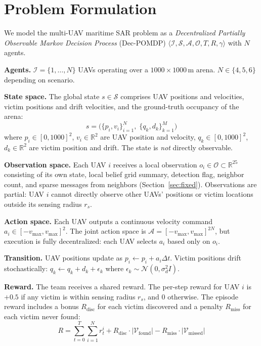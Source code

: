 \documentclass[journal]{IEEEtran}
\begin{document}
\section{Problem Formulation}
\label{sec:problem}

We model the multi-UAV maritime SAR problem as a \emph{Decentralized Partially
Observable Markov Decision Process} (Dec-POMDP) \cite{decentralized_pomdp}
$\langle \mathcal{I}, \mathcal{S}, \mathcal{A}, \mathcal{O}, T, R, \gamma \rangle$
with $N$ agents.

\textbf{Agents.} $\mathcal{I} = \{1, \ldots, N\}$ UAVs operating over a
$1000 \times 1000$\,m arena. $N \in \{4, 5, 6\}$ depending on scenario.

\textbf{State space.} The global state $s \in \mathcal{S}$ comprises UAV positions
and velocities, victim positions and drift velocities, and the ground-truth occupancy
of the arena:
\begin{equation}
  s = \bigl(\{p_i, v_i\}_{i=1}^N,\; \{q_k, d_k\}_{k=1}^M\bigr)
  \label{eq:state}
\end{equation}
where $p_i \in [0,1000]^2$, $v_i \in \mathbb{R}^2$ are UAV position and velocity,
$q_k \in [0,1000]^2$, $d_k \in \mathbb{R}^2$ are victim position and drift.
The state is \emph{not} directly observable.

\textbf{Observation space.} Each UAV $i$ receives a local observation
$o_i \in \mathcal{O} \subset \mathbb{R}^{25}$ consisting of its own state, local
belief grid summary, detection flag, neighbor count, and sparse messages from
neighbors (Section~\ref{sec:fixed}). Observations are partial: UAV $i$ cannot
directly observe other UAVs' positions or victim locations outside its sensing
radius $r_s$.

\textbf{Action space.} Each UAV outputs a continuous velocity command
$a_i \in [-v_{\max}, v_{\max}]^2$. The joint action space is
$\mathcal{A} = [-v_{\max}, v_{\max}]^{2N}$, but execution is fully decentralized:
each UAV selects $a_i$ based only on $o_i$.

\textbf{Transition.} UAV positions update as $p_i \leftarrow p_i + a_i \Delta t$.
Victim positions drift stochastically: $q_k \leftarrow q_k + d_k + \epsilon_k$
where $\epsilon_k \sim \mathcal{N}(0, \sigma_d^2 I)$.

\textbf{Reward.} The team receives a shared reward. The per-step reward for UAV $i$
is $+0.5$ if any victim is within sensing radius $r_s$, and $0$ otherwise. The
episode reward includes a bonus $R_{\text{disc}}$ for each victim discovered and
a penalty $R_{\text{miss}}$ for each victim never found:
\begin{equation}
  R = \sum_{t=0}^{T} \sum_{i=1}^{N} r_t^i
      + R_{\text{disc}} \cdot |\mathcal{V}_{\text{found}}|
      - R_{\text{miss}} \cdot |\mathcal{V}_{\text{missed}}|
  \label{eq:reward_formal}
\end{equation}
\end{document}
